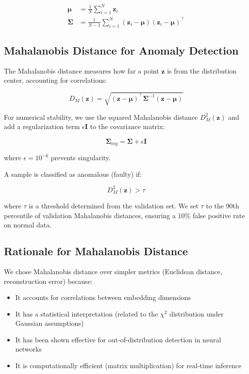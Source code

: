\begin{align}
\boldsymbol{\mu} &= \frac{1}{N} \sum_{i=1}^{N} \mathbf{z}_i \\
\boldsymbol{\Sigma} &= \frac{1}{N-1} \sum_{i=1}^{N} (\mathbf{z}_i - \boldsymbol{\mu})(\mathbf{z}_i - \boldsymbol{\mu})^\top
\end{align}

\subsection{Mahalanobis Distance for Anomaly Detection}

The Mahalanobis distance \parencite{de2000mahalanobis} measures how far a point $\mathbf{z}$ is from the distribution center, accounting for correlations:

\begin{equation}
D_M(\mathbf{z}) = \sqrt{(\mathbf{z} - \boldsymbol{\mu})^\top \boldsymbol{\Sigma}^{-1} (\mathbf{z} - \boldsymbol{\mu})}
\end{equation}

For numerical stability, we use the squared Mahalanobis distance $D_M^2(\mathbf{z})$ and add a regularization term $\epsilon \mathbf{I}$ to the covariance matrix:

\begin{equation}
\boldsymbol{\Sigma}_{\text{reg}} = \boldsymbol{\Sigma} + \epsilon \mathbf{I}
\end{equation}

where $\epsilon = 10^{-6}$ prevents singularity.

A sample is classified as anomalous (faulty) if:

\begin{equation}
D_M^2(\mathbf{z}) > \tau
\end{equation}

where $\tau$ is a threshold determined from the validation set. We set $\tau$ to the 90th percentile of validation Mahalanobis distances, ensuring a 10\% false positive rate on normal data.

\subsection{Rationale for Mahalanobis Distance}

We chose Mahalanobis distance over simpler metrics (Euclidean distance, reconstruction error) because:
\begin{itemize}
    \item It accounts for correlations between embedding dimensions
    \item It has a statistical interpretation (related to the $\chi^2$ distribution under Gaussian assumptions)
    \item It has been shown effective for out-of-distribution detection in neural networks \parencite{lee2018simple}
    \item It is computationally efficient (matrix multiplication) for real-time inference
\end{itemize}

